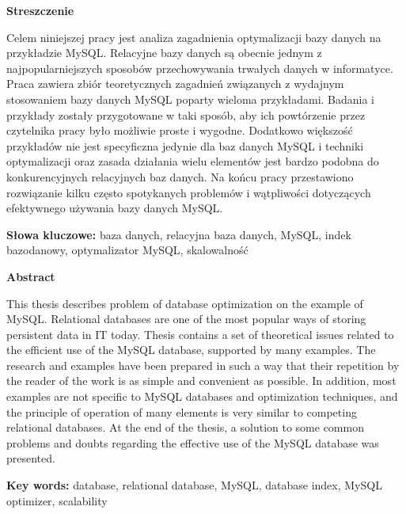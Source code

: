 \thispagestyle{empty}

{\Large \textbf{Streszczenie}}

\vspace{0.5 cm}

Celem niniejszej pracy jest analiza zagadnienia optymalizacji bazy danych na przykładzie MySQL. Relacyjne bazy danych są obecnie jednym z najpopularniejszych sposobów przechowywania trwałych danych w informatyce. Praca zawiera zbiór teoretycznych zagadnień związanych z wydajnym stosowaniem bazy danych MySQL poparty wieloma przykładami. Badania i przykłady zostały przygotowane w taki sposób, aby ich powtórzenie przez czytelnika pracy było możliwie proste i wygodne. Dodatkowo większość przykładów nie jest specyficzna jedynie dla baz danych MySQL i techniki optymalizacji oraz zasada działania wielu elementów jest bardzo podobna do konkurencyjnych relacyjnych baz danych. Na końcu pracy przestawiono rozwiązanie kilku często spotykanych problemów i wątpliwości dotyczących efektywnego używania bazy danych MySQL. 
\vspace{0.5 cm}

{ \textbf{Słowa kluczowe: }} 
baza danych, relacyjna baza danych, MySQL, indek bazodanowy, optymalizator MySQL, skalowalność


\totalemptypage


\thispagestyle{empty}

{\Large \textbf{Abstract}}

\vspace{0.5 cm}

This thesis describes problem of database optimization on the example of MySQL. Relational databases are one of the most popular ways of storing persistent data in IT today. Thesis contains a set of theoretical issues related to the efficient use of the MySQL database, supported by many examples. The research and examples have been prepared in such a way that their repetition by the reader of the work is as simple and convenient as possible. In addition, most examples are not specific to MySQL databases and optimization techniques, and the principle of operation of many elements is very similar to competing relational databases. At the end of the thesis, a solution to some common problems and doubts regarding the effective use of the MySQL database was presented.

\vspace{0.5 cm}

{ \textbf{Key words: }} 
database, relational database, MySQL, database index, MySQL optimizer, scalability

